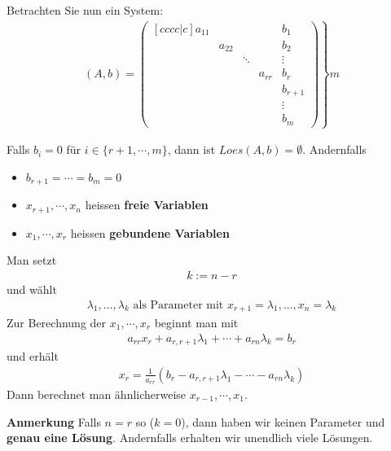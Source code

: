 \documentclass[11pt]{report}
\newcommand*\f[1] {\textbf{#1}}
\begin{document}
Betrachten Sie nun ein System:
\begin{align}
 (A,b) = \left. \begin{pmatrix}[cccc|c]
          a_{11} & & & & b_1\\
           & a_{22} & & & b_2\\
           & & \ddots & & \vdots \\
           & & & a_{rr} & b_{r}\\
           & & & & b_{r+1} \\
           & & & & \vdots\\
           & & & & b_m
         \end{pmatrix}
	 \right\} m
\end{align}

Falls $b_i = 0$ für $i \in \{r+1, \cdots, m\}$, dann ist $Loes(A, b) = \emptyset$. Andernfalls
\begin{itemize}
 \item $b_{r+1} = \cdots = b_m = 0$
 \item $x_{r+1}, \cdots, x_n$ heissen \f{freie Variablen} 
 \item $x_{1}, \cdots, x_r$ heissen \f{gebundene Variablen}
\end{itemize}
Man setzt
\begin{align}
k := n-r
\end{align}
und wählt 
\begin{align}
\lambda_1, ..., \lambda_k \text{ als Parameter mit } x_{r+1} = \lambda_1, ...,  x_n = \lambda_k 
\end{align}
Zur Berechnung der $x_1, \cdots, x_r$ beginnt man mit 
\begin{align}
 a_{rr} x_r + a_{r, r+1} \lambda_1 + \cdots + a_{r n} \lambda_k = b_r 
\end{align}
und erhält
\begin{align}
x_r = \frac{1}{a_{rr}}(b_r - a_{r,r+1} \lambda_1 - \cdots - a_{r n} \lambda_k)
\end{align}
Dann berechnet man ähnlicherweise $x_{r-1}, \cdots, x_1$.

\f{Anmerkung}
Falls $n=r$ so ($k=0$), dann haben wir keinen Parameter und \f{genau eine Lösung}. Andernfalls erhalten wir unendlich viele Lösungen.
\end{document}
